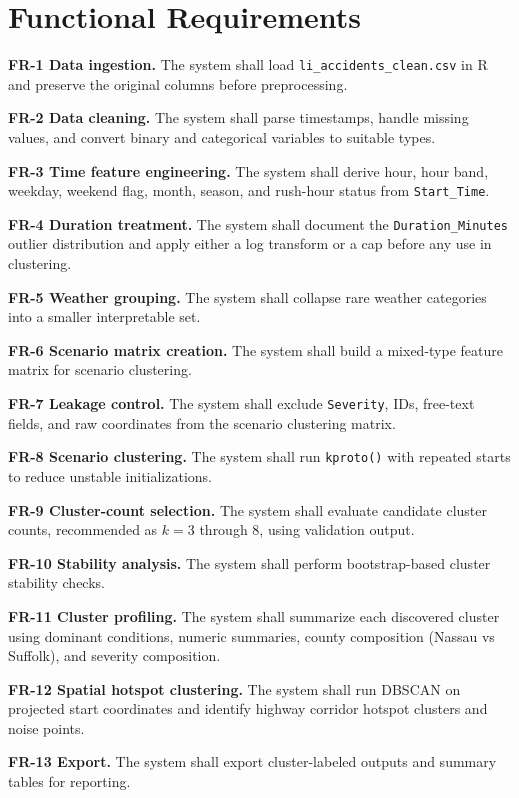 \documentclass[11pt]{article}
\begin{document}
\section{Functional Requirements}

\textbf{FR-1 Data ingestion.} The system shall load \texttt{li\_accidents\_clean.csv} in R and preserve the original columns before preprocessing.

\textbf{FR-2 Data cleaning.} The system shall parse timestamps, handle missing values, and convert binary and categorical variables to suitable types.

\textbf{FR-3 Time feature engineering.} The system shall derive hour, hour band, weekday, weekend flag, month, season, and rush-hour status from \texttt{Start\_Time}.

\textbf{FR-4 Duration treatment.} The system shall document the \texttt{Duration\_Minutes} outlier distribution and apply either a log transform or a cap before any use in clustering.

\textbf{FR-5 Weather grouping.} The system shall collapse rare weather categories into a smaller interpretable set.

\textbf{FR-6 Scenario matrix creation.} The system shall build a mixed-type feature matrix for scenario clustering.

\textbf{FR-7 Leakage control.} The system shall exclude \texttt{Severity}, IDs, free-text fields, and raw coordinates from the scenario clustering matrix.

\textbf{FR-8 Scenario clustering.} The system shall run \texttt{kproto()} with repeated starts to reduce unstable initializations.

\textbf{FR-9 Cluster-count selection.} The system shall evaluate candidate cluster counts, recommended as $k = 3$ through $8$, using validation output.

\textbf{FR-10 Stability analysis.} The system shall perform bootstrap-based cluster stability checks.

\textbf{FR-11 Cluster profiling.} The system shall summarize each discovered cluster using dominant conditions, numeric summaries, county composition (Nassau vs Suffolk), and severity composition.

\textbf{FR-12 Spatial hotspot clustering.} The system shall run DBSCAN on projected start coordinates and identify highway corridor hotspot clusters and noise points.

\textbf{FR-13 Export.} The system shall export cluster-labeled outputs and summary tables for reporting.
\end{document}
